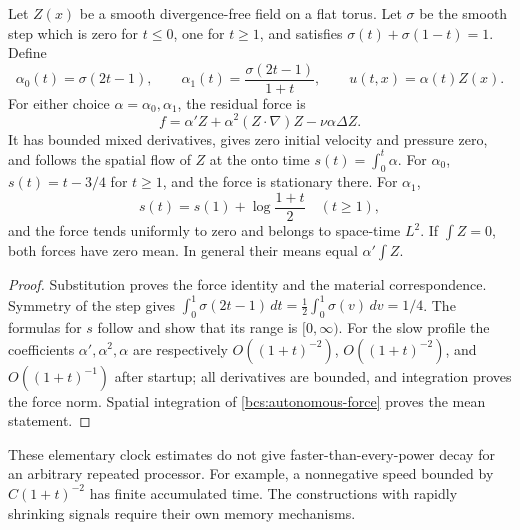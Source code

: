 \begin{proposition}\label{bcs:autonomous-profile}
Let $Z(x)$ be a smooth divergence-free field on a flat torus. Let $\sigma$ be the smooth step which is zero for $t\le0$, one for $t\ge1$, and satisfies $\sigma(t)+\sigma(1-t)=1$. Define
\[
 \alpha_0(t)=\sigma(2t-1),\qquad
 \alpha_1(t)=\frac{\sigma(2t-1)}{1+t},\qquad
 u(t,x)=\alpha(t)Z(x).
\]
For either choice $\alpha=\alpha_0,\alpha_1$, the residual force is
\begin{equation}\label{bcs:autonomous-force}
 f=\alpha'Z+\alpha^2(Z\cdot\nabla)Z-\nu\alpha\Delta Z.
\end{equation}
It has bounded mixed derivatives, gives zero initial velocity and pressure zero, and follows the spatial flow of $Z$ at the onto time $s(t)=\int_0^t\alpha$. For $\alpha_0$, $s(t)=t-3/4$ for $t\ge1$, and the force is stationary there. For $\alpha_1$,
\[
 s(t)=s(1)+\log\frac{1+t}{2}\quad(t\ge1),
\]
and the force tends uniformly to zero and belongs to space-time $L^2$. If $\int Z=0$, both forces have zero mean. In general their means equal $\alpha'\int Z$.
\end{proposition}
\begin{proof}
Substitution proves the force identity and the material correspondence. Symmetry of the step gives
$\int_0^1\sigma(2t-1)\,dt=\frac12\int_0^1\sigma(v)\,dv=1/4$.
The formulas for $s$ follow and show that its range is $[0,\infty)$. For the slow profile the coefficients $\alpha',\alpha^2,\alpha$ are respectively $O((1+t)^{-2})$, $O((1+t)^{-2})$, and $O((1+t)^{-1})$ after startup; all derivatives are bounded, and integration proves the force norm. Spatial integration of \eqref{bcs:autonomous-force} proves the mean statement.
\end{proof}

These elementary clock estimates do not give faster-than-every-power decay for an arbitrary repeated processor. For example, a nonnegative speed bounded by $C(1+t)^{-2}$ has finite accumulated time. The constructions with rapidly shrinking signals require their own memory mechanisms.
